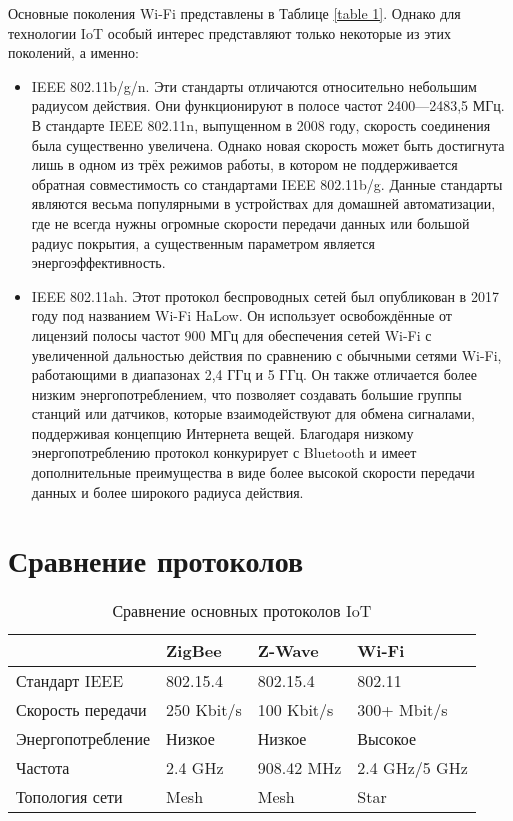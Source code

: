 	Основные поколения Wi-Fi представлены в Таблице \ref{table 1}. Однако для технологии IoT особый интерес 
	представляют только некоторые из этих поколений, а именно:
	
	\begin{itemize}
		\item IEEE 802.11b/g/n. Эти стандарты отличаются относительно небольшим радиусом действия.
		Они функционируют в полосе частот 2400—2483,5 МГц. В стандарте  IEEE 802.11n, выпущенном
		в 2008 году, скорость соединения была существенно увеличена. Однако новая скорость может
		быть достигнута лишь в одном из трёх режимов работы, в котором не поддерживается обратная
		совместимость со стандартами IEEE 802.11b/g. Данные стандарты являются весьма популярными
		в устройствах для домашней автоматизации, где не всегда нужны огромные скорости передачи
		данных или большой радиус покрытия, а существенным параметром является энергоэффективность.
		\item IEEE 802.11ah. Этот протокол беспроводных сетей был опубликован в 2017 году под названием 
		Wi-Fi HaLow. Он использует освобождённые от лицензий полосы частот 900 МГц для обеспечения 
		сетей Wi-Fi с увеличенной дальностью действия по сравнению с обычными сетями Wi-Fi, работающими 
		в диапазонах 2,4 ГГц и 5 ГГц. Он также отличается более низким энергопотреблением, что позволяет 
		создавать большие группы станций или датчиков, которые взаимодействуют для обмена сигналами, 
		поддерживая концепцию Интернета вещей. Благодаря низкому энергопотреблению протокол конкурирует 
		с Bluetooth и имеет дополнительные преимущества в виде более высокой скорости передачи данных 
		и более широкого радиуса действия.
	\end{itemize}
	
	
	\section{Сравнение протоколов}
	
		\begin{table}[h]
		\centering
		\begin{tabular}{ | l | l | l | l | }
			\hline
			 & ZigBee & Z-Wave & Wi-Fi \\ \hline
			Стандарт IEEE & 802.15.4 & 802.15.4 & 802.11 \\ \hline
			Скорость передачи & 250 Kbit/s & 100 Kbit/s & 300+ Mbit/s \\ \hline
			Энергопотребление & Низкое & Низкое & Высокое \\ \hline
			Частота & 2.4 GHz  & 908.42 MHz & 2.4 GHz/5 GHz \\ \hline
			Топология сети & Mesh & Mesh & Star \\
			\hline
		\end{tabular}
		\caption{Сравнение основных протоколов IoT}
		\label{table 2}
	\end{table}

